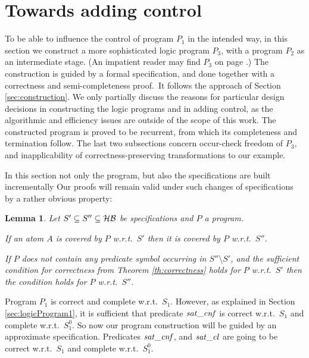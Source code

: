 \documentclass{tlp}
\newtheorem{lemma}[theorem]{Lemma}
\newcommand*{\HB}{{\ensuremath{\cal{H B}}}\xspace}
\begin{document}
\section{Towards adding control}
\label{sec:program}





To be able to influence the control of program $P_1$ in the intended way,
in this section
we construct a more sophisticated logic program $P_3$, with a program 
$P_2$ as an intermediate stage.
(An impatient reader may find
$P_3$ on page \pageref{final.program}.)
The construction is guided by a formal specification, and done together with
a correctness and semi-completeness proof.\
It follows the approach of Section \ref{sec:construction}.
We only partially discuss the reasons for particular design decisions in
constructing the logic programs
  and in adding control, as the algorithmic and efficiency
  issues are outside of the scope of this work.
The constructed program is proved to be recurrent, from which its
completeness and termination follow.
The last two subsections concern occur-check freedom of $P_3$,
and inapplicability of correctness-preserving transformations to our example. 




In this section not only the program, but also the specifications
are built incrementally
Our proofs will
remain valid under such changes of specifications by a rather obvious
property: 
\begin{lemma}
  Let $S'\subseteq S''\subseteq\HB$ be specifications and $P$ a program.

  If an atom $A$ is covered by $P$ w.r.t.\ $S'$ then it is covered by
  $P$ w.r.t.~$S''$. 

  If $P$ does not contain any predicate symbol occurring in
  $S''\setminus S'$, and
  the sufficient condition for correctness
  from Theorem \ref{th:correctness}
  holds for $P$ w.r.t.\ $S'$ 
   then 
  the condition holds for $P$ w.r.t.\ $S''$.
\end{lemma}






Program $P_1$ is correct and complete w.r.t.\ $S_1$.  However,
as explained in Section \ref{sec:logicProgram1}, 
   it is sufficient that predicate ${\it sat\_c n f}$ 
   is correct w.r.t.\ $S_1$ and complete w.r.t.\ $S_1^0$.
So now our program construction will be guided by an approximate
specification.   
Predicates  ${\it sat\_c n f}$, and ${\it sat\_cl}$ are going to be
correct w.r.t.\ $S_1$ and complete w.r.t.~$S_1^0$.
\end{document}

